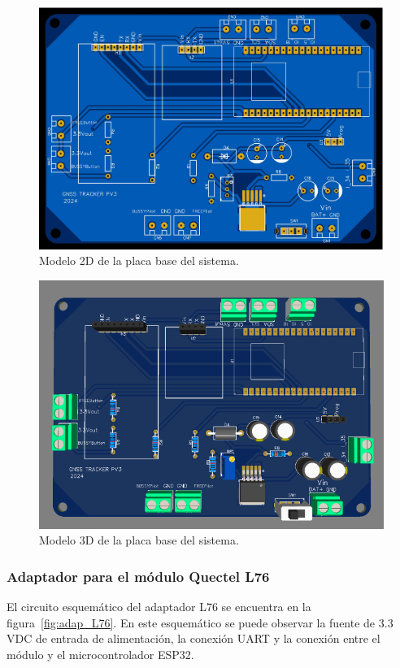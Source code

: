 \begin{figure}[htbp]
	\centering
	\includegraphics[width=.8\textwidth]{./Figures/PCB_TFE_Modelo_2D.png}
	\caption{Modelo 2D de la placa base del sistema.}
	\label{fig:placa_base_2d}
\end{figure}

\begin{figure}[htbp]
	\centering
	\includegraphics[width=.8\textwidth]{./Figures/PCB_TFE_Modelo_3D.png}
	\caption{Modelo 3D de la placa base del sistema.}
	\label{fig:placa_base_3d}
\end{figure}


\subsubsection{Adaptador para el módulo Quectel L76}

El circuito esquemático del adaptador L76 se encuentra en la figura~\ref{fig:adap_L76}. En este esquemático se puede observar la fuente de 3.3 VDC de entrada de alimentación, la conexión UART y la conexión entre el módulo y el microcontrolador ESP32.  

